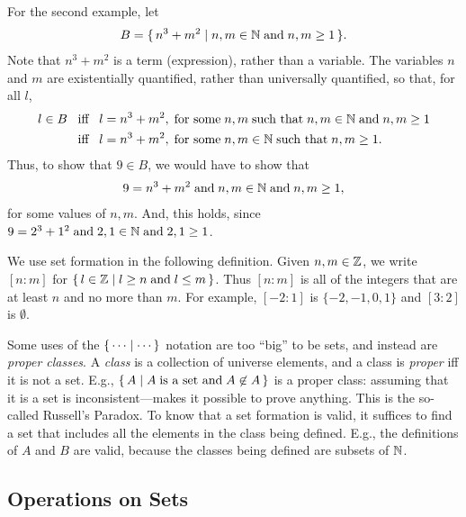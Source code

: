 For the second example, let
\begin{gather*}
B=\{ \, n^3+m^2 \mid n,m\in\mathbb{N}\;\allowbreak\mbox{and}\allowbreak\;n,m\geq 1 \, \} .
\end{gather*}
Note that $n^3+m^2$ is a term (expression), rather than a variable.
The variables $n$ and $m$ are existentially quantified,
%
%
rather than universally quantified, so that, for all $l$,
\begin{align*}
l\in B&\mathrel{\;\;\allowbreak\mbox{iff}\allowbreak\;\;} l = n^3 + m^2, \;\allowbreak\mbox{for some}\allowbreak\;
         n, m\;\allowbreak\mbox{such that}\allowbreak\;n,m\in\mathbb{N}\;\allowbreak\mbox{and}\allowbreak\;n,m\geq 1 \\
      &\mathrel{\;\;\allowbreak\mbox{iff}\allowbreak\;\;} l = n^3 + m^2, \;\allowbreak\mbox{for some}\allowbreak\;
         n, m\in\mathbb{N}\;\allowbreak\mbox{such that}\allowbreak\;n,m\geq 1.
\end{align*}
Thus, to show that $9\in B$, we would have to show that
\begin{gather*}
9 = n^3 + m^2\;\allowbreak\mbox{and}\allowbreak\;n,m\in\mathbb{N}\;\allowbreak\mbox{and}\allowbreak\;n,m\geq 1 ,
\end{gather*}
for some values of $n,m$.  And, this holds, since $9 = 2^3 +
1^2\;\allowbreak\mbox{and}\allowbreak\;2,1\in\mathbb{N}\;\allowbreak\mbox{and}\allowbreak\;2,1\geq 1$.

We use set formation in the following definition.
Given $n,m\in\mathbb{Z}$, we write $[n:m]$ for $\{ \, l\in\mathbb{Z} \mid l\geq
  n\;\allowbreak\mbox{and}\allowbreak\;l\leq m \, \}$.
%
%
%
%
%
Thus $[n:m]$ is all of the integers that are at least $n$ and no
more than $m$.  For example, $[-2:1]$ is $\{-2,-1,0,1\}$ and
$[3:2]$ is $\emptyset$.

Some uses of the $\{ \, \cdots \mid \cdots \, \}$ notation are too ``big'' to
be sets, and instead are \emph{proper classes}. A \emph{class} is a
collection of universe elements, and a class is \emph{proper} iff it
is not a set.  E.g., $\{ \, A \mid A\;\allowbreak\mbox{is a set and}\allowbreak\; A\not\in A \, \}$ is
a proper class: assuming that it is a set is inconsistent---makes it
possible to prove anything. This is the so-called Russell's Paradox.
%
To know that a set formation is valid, it suffices to find a set that
includes all the elements in the class being defined.  E.g., the
definitions of $A$ and $B$ are valid, because the classes being
defined are subsets of $\mathbb{N}$.
%
%

\subsection{Operations on Sets}

